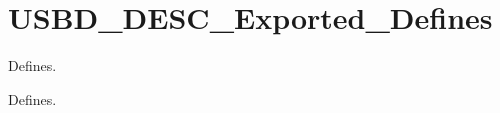 \hypertarget{group__USBD__DESC__Exported__Defines}{}\section{U\+S\+B\+D\+\_\+\+D\+E\+S\+C\+\_\+\+Exported\+\_\+\+Defines}
\label{group__USBD__DESC__Exported__Defines}


Defines.  


Defines. 

